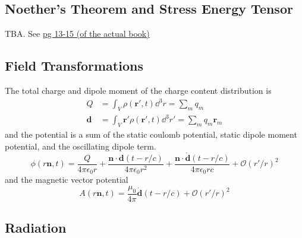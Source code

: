 \documentclass{article}
\numberwithin{equation}{subsection}
\begin{document}
\subsection{Noether's Theorem and Stress Energy Tensor}
TBA. See \href{http://www.damtp.cam.ac.uk/user/tong/qft/one.pdf}{pg 13-15 (of the actual book)}
\subsection{Field Transformations}
The total charge and dipole moment of the charge content distribution is
\begin{align*}
    Q &= \int_V \rho(\bm{r}',t)\dd^3r = \sum_m q_m \\ 
    \bm{d} &= \int_V \bm{r}' \rho(\bm{r}',t)\dd^3 r' = \sum_m q_m\bm{r}_m
\end{align*}
and the potential is a sum of the static coulomb potential, static dipole moment potential, and the oscillating dipole term.
\begin{equation*}
    \phi(r\bm{n}, t) = \frac{Q}{4\pi\epsilon_0 r} + \frac{\bm{n}\cdot \bm{d}(t-r/c)}{4\pi\epsilon_0 r^2} + \frac{\bm{n}\cdot \dot{\bm{d}}(t-r/c)}{4\pi \epsilon_0 rc} + \mathcal{O}(r'/r)^2
\end{equation*}
and the magnetic vector potential
\begin{equation*}
    A(r\bm{n}, t) = \frac{\mu_0}{4\pi}\dot{\bm{d}}(t-r/c) + \mathcal{O}(r'/r)^2
\end{equation*} 
\subsection{Radiation}
\end{document}
